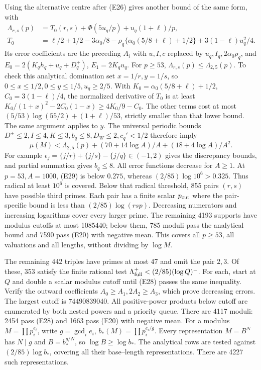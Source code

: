 \documentclass[11pt]{article}
\theoremstyle{definition}\newtheorem{definition}[theorem]{Definition}
\theoremstyle{remark}\newtheorem{remark}[theorem]{Remark}
\begin{document}
Using the alternative centre after (E26) gives another bound of the
same form, with
\[
\begin{split}
 \Lambda_{r,s}(p)&=T_0(r,s)+\Phi(5u_q/p)+u_q(1+\ell)/p,\\
 T_0&=\ell/2+1/2-3\alpha_0/8
 -\rho_q\{\alpha_0(5/8+\ell)+1/2\}+3(1-\ell)u_q^2/4 .
\end{split}
\]
Its error coefficients are the preceding \(A_i\) with
\(u,I,c\) replaced by \(u_q,I_q,2\alpha_0\rho_q\), and
\(E_0=2(K_qh_q+u_q+D_q^+)\), \(E_1=2K_qu_q\).
For \(p\ge53\), \(\Lambda_{r,s}(p)\le\Lambda_{2,5}(p)\).
To check this analytical domination set \(x=1/r,y=1/s\), so
\(0\le x\le1/2,0\le y\le1/5,u_q\ge2/5\).
With \(K_0=\alpha_0(5/8+\ell)+1/2\),
\(C_0=3(1-\ell)/4\), the normalized derivative of \(T_0\) is at
least \(K_0/(1+x)^2-2C_0(1-x)\ge4K_0/9-C_0\).
The other terms cost at most
\((5/53)\log(55/2)+(1+\ell)/53\), strictly smaller than that lower
bound. The same argument applies to \(y\).
The universal periodic bounds
\(D^\pm\le2,I\le4,K\le3,b_q\le8,D_W\le2,c_q'<1/2\)
therefore imply
\[
 \mu(M)<\Lambda_{2,5}(p)
       +(70+14\log A)/A+(18+4\log A)/A^2 .                         \tag{E29}
\]
For example \(\epsilon_j=\{j/r\}+\{j/s\}-\{j/q\}\in(-1,2)\)
gives the discrepancy bounds, and partial summation gives \(b_q\le8\).
All error functions decrease for \(A\ge1\).
At \(p=53,A=1000\), (E29) is below \(0.275\), whereas
\((2/85)\log10^6>0.325\). Thus radical at least \(10^6\) is covered.
Below that radical threshold, 855 pairs \((r,s)\) have possible
third primes. Each pair has a finite scalar \(p_{\rm cut}\) where
the pair-specific bound is less than \((2/85)\log(rsp)\).
Decreasing numerators and increasing logarithms cover every larger
prime. The remaining 4193 supports have modulus cutoffs at most
1085440; below them, 785 moduli pass the analytical bound and 7590
pass (E20) with negative mean. This covers all \(p\ge53\), all
valuations and all lengths, without dividing by \(\log M\).

The remaining 442 triples have primes at most 47 and omit the pair
\(2,3\). Of these, 353 satisfy the finite rational test
\(\Lambda_{\rm full}^{+}<(2/85)(\log Q)^{-}\).
For each, start at \(Q\) and double a scalar modulus cutoff until
(E28) passes the same inequality. Verify the outward coefficients
\(A_0\ge A_1,2A_2\ge A_3\), which prove decreasing errors.
The largest cutoff is \(74490839040\). All positive-power products
below cutoff are enumerated by both nested powers and a priority
queue. There are 4117 moduli: 2454 pass (E28) and 1663 pass (E20)
with negative mean. For a modulus \(M=\prod p_i^{e_i}\), write
\(g=\gcd_i e_i\), \(b_*(M)=\prod p_i^{e_i/g}\).
Every representation \(M=B^N\) has \(N\mid g\) and
\(B=b_*^{g/N}\), so \(\log B\ge\log b_*\). The analytical rows
are tested against \((2/85)\log b_*\), covering all their
base--length representations. There are 4227 such representations.
\end{document}
